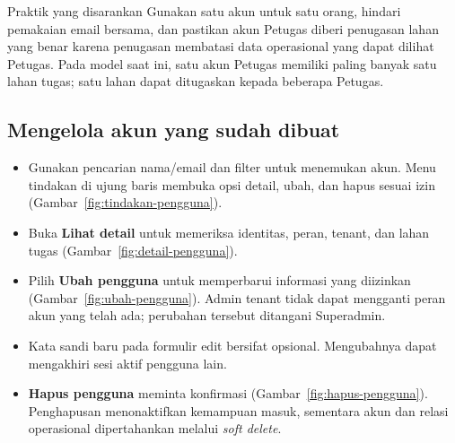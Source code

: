 \begin{guidebox}{Praktik yang disarankan}
  Gunakan satu akun untuk satu orang, hindari pemakaian email bersama, dan pastikan akun Petugas diberi penugasan lahan yang benar karena penugasan membatasi data operasional yang dapat dilihat Petugas. Pada model saat ini, satu akun Petugas memiliki paling banyak satu lahan tugas; satu lahan dapat ditugaskan kepada beberapa Petugas.
\end{guidebox}

\subsection{Mengelola akun yang sudah dibuat}

\begin{itemize}
  \item Gunakan pencarian nama/email dan filter untuk menemukan akun. Menu tindakan di ujung baris membuka opsi detail, ubah, dan hapus sesuai izin (Gambar~\ref{fig:tindakan-pengguna}).
\end{itemize}


\begin{itemize}
  \item Buka \textbf{Lihat detail} untuk memeriksa identitas, peran, tenant, dan lahan tugas (Gambar~\ref{fig:detail-pengguna}).
\end{itemize}


\begin{itemize}
  \item Pilih \textbf{Ubah pengguna} untuk memperbarui informasi yang diizinkan (Gambar~\ref{fig:ubah-pengguna}). Admin tenant tidak dapat mengganti peran akun yang telah ada; perubahan tersebut ditangani Superadmin.
  \item Kata sandi baru pada formulir edit bersifat opsional. Mengubahnya dapat mengakhiri sesi aktif pengguna lain.
\end{itemize}


\begin{itemize}
  \item \textbf{Hapus pengguna} meminta konfirmasi (Gambar~\ref{fig:hapus-pengguna}). Penghapusan menonaktifkan kemampuan masuk, sementara akun dan relasi operasional dipertahankan melalui \emph{soft delete}.
\end{itemize}


